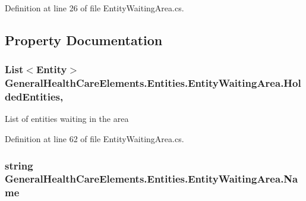 Definition at line 26 of file Entity\+Waiting\+Area.\+cs.



\subsection{Property Documentation}
\subsubsection[{\texorpdfstring{Holded\+Entities}{HoldedEntities}}]{\setlength{\rightskip}{0pt plus 5cm}List$<${\bf Entity}$>$ General\+Health\+Care\+Elements.\+Entities.\+Entity\+Waiting\+Area.\+Holded\+Entities\hspace{0.3cm}{\ttfamily [get]}, {\ttfamily [set]}}\hypertarget{class_general_health_care_elements_1_1_entities_1_1_entity_waiting_area_adfa8146025e3f525c57b443905256058}{}\label{class_general_health_care_elements_1_1_entities_1_1_entity_waiting_area_adfa8146025e3f525c57b443905256058}


List of entities waiting in the area 



Definition at line 62 of file Entity\+Waiting\+Area.\+cs.

\subsubsection[{\texorpdfstring{Name}{Name}}]{\setlength{\rightskip}{0pt plus 5cm}string General\+Health\+Care\+Elements.\+Entities.\+Entity\+Waiting\+Area.\+Name\hspace{0.3cm}{\ttfamily [get]}}\hypertarget{class_general_health_care_elements_1_1_entities_1_1_entity_waiting_area_ac42bea50a543ed5cdba65fcf65d4b670}{}\label{class_general_health_care_elements_1_1_entities_1_1_entity_waiting_area_ac42bea50a543ed5cdba65fcf65d4b670}


